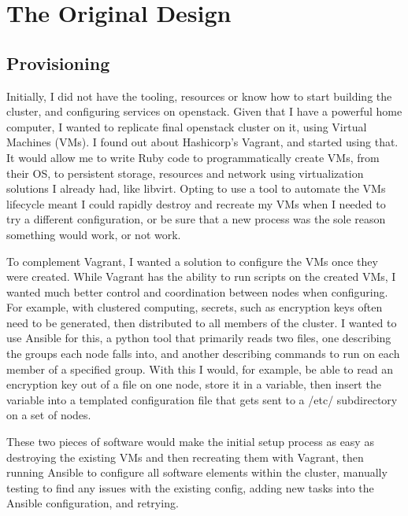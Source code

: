 \documentclass{article}
\begin{document}
\section{The Original Design}
\subsection{Provisioning}
Initially, I did not have the tooling, resources or know how to start building the cluster, and configuring services on openstack. Given that I have a powerful home computer, I wanted to replicate final openstack cluster on it, using Virtual Machines (VMs). I found out about Hashicorp's Vagrant, and started using that. It would allow me to write Ruby code to programmatically create VMs, from their OS, to persistent storage, resources and network using virtualization solutions I already had, like libvirt. Opting to use a tool to automate the VMs lifecycle meant I could rapidly destroy and recreate my VMs when I needed to try a different configuration, or be sure that a new process was the sole reason something would work, or not work.

To complement Vagrant, I wanted a solution to configure the VMs once they were created. While Vagrant has the ability to run scripts on the created VMs, I wanted much better control and coordination between nodes when configuring. For example, with clustered computing, secrets, such as encryption keys often need to be generated, then distributed to all members of the cluster. I wanted to use Ansible for this, a python tool that primarily reads two files, one describing the groups each node falls into, and another describing commands to run on each member of a specified group. With this I would, for example, be able to read an encryption key out of a file on one node, store it in a variable, then insert the variable into a templated configuration file that gets sent to a /etc/ subdirectory on a set of nodes.

These two pieces of software would make the initial setup process as easy as destroying the existing VMs and then recreating them with Vagrant, then running Ansible to configure all software elements within the cluster, manually testing to find any issues with the existing config, adding new tasks into the Ansible configuration, and retrying.
\end{document}
